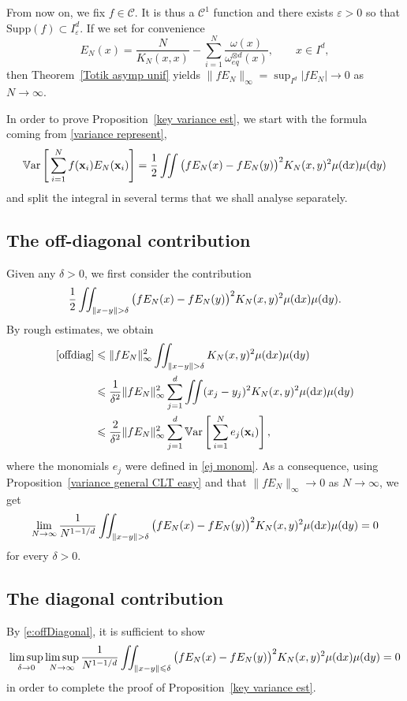 \documentclass[a4paper,11pt]{article}
\numberwithin{equation}{section}
\theoremstyle{definition}
\newcommand{\eq}{\begin{equation}}
\newcommand{\qe}{\end{equation}}
\newcommand{\bv}{\mathbf}
\renewcommand{\leq}{\leqslant}
\renewcommand{\epsilon}{\varepsilon}
\renewcommand{\d}{ {\rm d}}
\begin{document}
From now on, we fix $f\in\mathscr C$. It is thus a $\mathscr C^1$ function and
there exists $\epsilon>0$ so that $\mathrm{Supp}(f)\subset I_\epsilon^d$. If we
set for convenience
$$ E_N(x) =  \frac{N}{K_N(x,x)}- \sum_{i=1}^N
\frac{\omega(x)}{\omega_{eq}^{\otimes d}(x)}, \qquad x\in I^d,  $$
then Theorem~\ref{Totik asymp unif} yields $\|fE_N\|_\infty = \sup_{I^d}\vert
fE_N \vert\to0$ as $N\to\infty$.

In order to prove Proposition~\ref{key variance est}, we start with the formula coming from \eqref{variance represent},
\[
\mathbb V{\rm ar}\left[\,\sum_{i=1}^N   f(\bv x_i) E_N(\bv x_i)\right]=\frac12\iint \big(f E_N(x)-f E_N(y)\big)^2K_N(x,y)^2\mu(\d x)\mu(\d y)
\]
and split the integral in several terms that we shall analyse separately.

\subsection{The off-diagonal contribution}
Given any $\delta>0$, we first consider  the contribution
\eq
\label{offdiag}
\frac12\iint_{\|x-y\|>\delta} \big(fE_N(x)-fE_N(y)\big)^2K_N(x,y)^2\mu(\d x)\mu(\d y).
\qe
By rough estimates, we obtain
 \begin{align*}
 \eqref{offdiag} & \leq \| f E_N\|_\infty^2\iint_{\|x-y\|>\delta}K_N(x,y)^2\mu(\d x)\mu(\d y)\\
 & \leq  \frac{1}{\delta^2}\| f E_N\|_\infty^2\sum_{j=1}^d\iint (x_j-y_j)^2K_N(x,y)^2\mu(\d x)\mu(\d y)\\
 & \leq  \frac{2}{\delta^2}\| f E_N\|_\infty^2\sum_{j=1}^d  \mathbb V{\rm ar}\left[\,\sum_{i=1}^N  e_j(\bv x_i)\right],
 \end{align*}
where the monomials $e_j$ were defined in \eqref{ej monom}. As a consequence,
using Proposition~\ref{variance general CLT easy} and that $\| f E_N\|_\infty\to
0$ as $N\to\infty$, we get
\eq
\lim_{N\to\infty} \frac{1}{N^{1-1/d}}\iint_{\|x-y\|>\delta} \big(fE_N(x)-fE_N(y)\big)^2K_N(x,y)^2\mu(\d x)\mu(\d y)=0
\label{e:offDiagonal}
\qe
for every $\delta>0$.

\subsection{The diagonal contribution}

By \eqref{e:offDiagonal}, it is sufficient to show
\eq
\label{diag obj}
\limsup_{\delta\to 0}\limsup_{N\to\infty} \frac{1}{N^{1-1/d}}\iint_{\|x-y\|\leq\delta} \big(fE_N(x)-fE_N(y)\big)^2K_N(x,y)^2\mu(\d x)\mu(\d y)=0
\qe
in order to complete the proof of Proposition~\ref{key variance est}.
\end{document}
